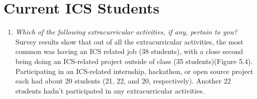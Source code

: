 \section{Current ICS Students}
\begin{enumerate}
\begin{figure}[h]
\centering
\texttt{[image: sr-extracurric-bar]}
\caption{Results for extracurricular participation by event type.}
\end{figure}

\begin{figure}[h]
\centering
\texttt{[image: sr-extracurric-pie]}
\caption{Results for extracurricular participation by amount of participation (all students).}
\end{figure}

\begin{figure}[h]
\centering
\texttt{[image: sr-extracurric-pie-midgrad]}
\caption{Results for extracurricular participation by amount of participation (mid to graduating students only).}
\end{figure}
\item \textit{Which of the following extracurricular activities, if any, pertain to you?}
Survey results show that out of all the extracurricular activities, the most common was having an ICS related job (38 students), with a close second being doing an ICS-related project outside of class (35 students)(Figure 5.4). Participating in an ICS-related internship, hackathon, or open source project each had about 20 students (21, 22, and 20, respectively). Another 22 students hadn't participated in any extracurricular activities. 


\end{enumerate}
